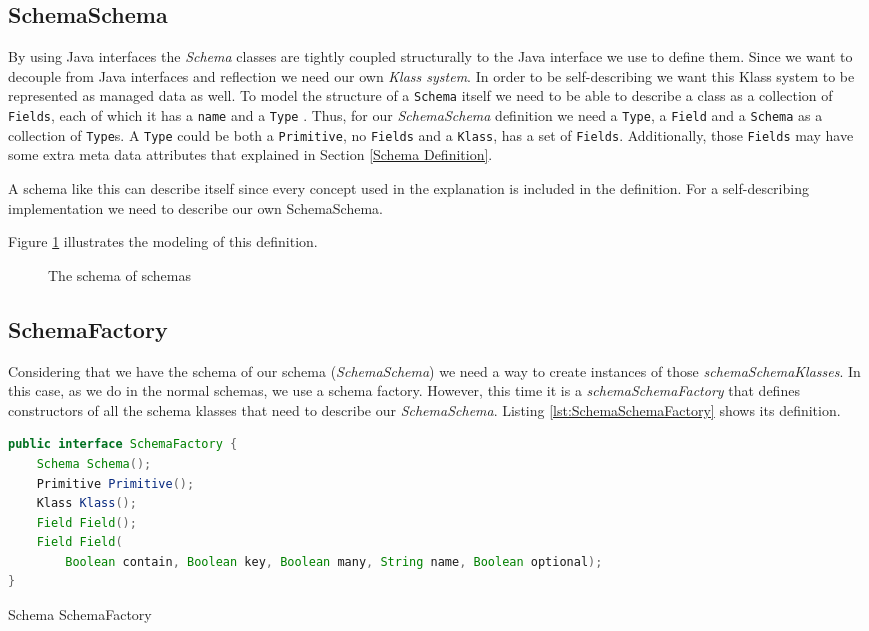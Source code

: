 \subsection{SchemaSchema}\label{sec:SchemaSchema}
By using Java interfaces the \textit{Schema} classes are tightly coupled structurally to the Java interface we use to define them.
Since we want to decouple from Java interfaces and reflection we need our own \textit{Klass system}.
In order to be self-describing we want this Klass system to be represented as managed data as well. 
To model the structure of a \texttt{Schema} itself we need to be able to describe a class as a collection of \texttt{Fields}, each of which it has a \texttt{name} and a \texttt{Type} \cite{loh2012managed}. 
Thus, for our \textit{SchemaSchema} definition we need a \texttt{Type}, a \texttt{Field} and a \texttt{Schema} as a collection of \texttt{Type}s. 
A \texttt{Type} could be both a \texttt{Primitive}, no \texttt{Fields} and a \texttt{Klass}, has a set of \texttt{Fields}.
Additionally, those \texttt{Fields} may have some extra meta data attributes that explained in Section \ref{Schema Definition}.

A schema like this can describe itself since every concept used in the explanation is included in the definition.
For a self-describing implementation we need to describe our own SchemaSchema. 

Figure \ref{fig:SchemaSchema_definition} illustrates the modeling of this definition.

\begin{figure}[H]
	\centering
  	\caption{The schema of schemas}
  	\label{fig:SchemaSchema_definition}
\end{figure}

\subsection{SchemaFactory}\label{sec:SchemaFactory}
Considering that we have the schema of our schema (\textit{SchemaSchema}) we need a way to create instances of those \textit{schemaSchemaKlasses}.
In this case, as we do in the normal schemas, we use a schema factory. 
However, this time it is a \textit{schemaSchemaFactory} that defines constructors of all the schema klasses that need to describe our \textit{SchemaSchema}.
Listing \ref{lst:SchemaSchemaFactory} shows its definition.

\begin{sourcecode} [H]
	\begin{lstlisting}[language=Java, escapechar=|]
public interface SchemaFactory {
    Schema Schema();
    Primitive Primitive();
    Klass Klass();
    Field Field();
    Field Field(
    	Boolean contain, Boolean key, Boolean many, String name, Boolean optional);
}
	\end{lstlisting}
	\caption{Schema SchemaFactory}
	\label{lst:SchemaSchemaFactory}
\end{sourcecode}

